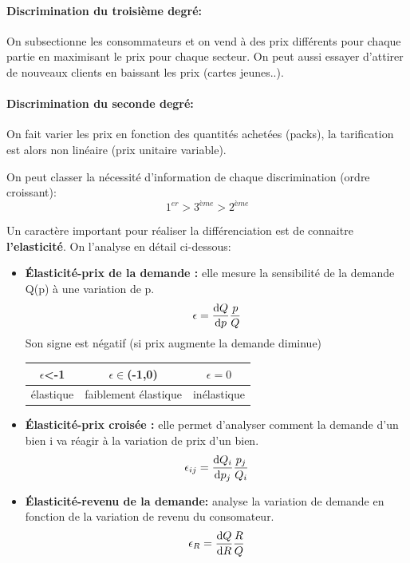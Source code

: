  \paragraph{Discrimination du troisième degré:} %
 \label{par:discrimination_du_troisieme_degre}
 On subsectionne les consommateurs et on vend à des prix différents pour chaque partie 
 en maximisant le prix pour chaque secteur. On peut aussi essayer d'attirer de nouveaux 
 clients en baissant les prix (cartes jeunes..).
 
 \paragraph{Discrimination du seconde degré:} %
 \label{par:discrimination_du_seconde_degre}
 On fait varier les prix en fonction des quantités achetées (packs), 
 la tarification est alors non linéaire (prix unitaire variable).
 


On peut classer la nécessité d'information de chaque discrimination (ordre croissant):
\[
	1^{er} > 3^{ème} > 2^{ème}
\]

Un caractère important pour réaliser la différenciation est de connaitre \textbf{l'elasticité}. On l'analyse en détail ci-dessous:

\begin{tcolorbox}[title=Élasticités]
	\begin{itemize}[label=]
		\item \textbf{Élasticité-prix de la demande :} elle mesure la sensibilité de la demande Q(p) à une variation de p. 
		\[
			\epsilon = \frac{\operatorname{d}\! Q}{\operatorname{d}\! p}\frac{p}{Q}
		\]
		Son signe est négatif (si prix augmente la demande diminue)
		\begin{tabular}{|c|c|c|}
		\hline
		$\epsilon$<-1 & $\epsilon \in$(-1,0) & $\epsilon =0$ \\
		\hline 
		élastique & faiblement élastique & inélastique \\
		\hline
		\end{tabular}
	
	
	
		\item \textbf{Élasticité-prix croisée :} elle permet d'analyser comment la demande d'un bien i va réagir à la variation de prix d'un bien.
		\[
			\epsilon_{ij} = \frac{\operatorname{d}\! Q_i}{\operatorname{d}\! p_j}\frac{p_j}{Q_i}
		\]
		\item \textbf{Élasticité-revenu de la demande:} analyse la variation de demande en fonction de la variation de revenu du consomateur.
		\[
			\epsilon_R = \frac{\operatorname{d}\! Q}{\operatorname{d}\! R}\frac{R}{Q}
		\]
	\end{itemize}
\end{tcolorbox}

